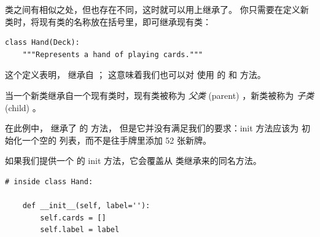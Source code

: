 
类之间有相似之处，但也存在不同，这时就可以用上继承了。
你只需要在定义新类时，将现有类的名称放在括号里，即可继承现有类：


\begin{lstlisting}
class Hand(Deck):
    """Represents a hand of playing cards."""
\end{lstlisting}


这个定义表明， 继承自  ；  这意味着我们也可以对  使用  的  和  方法。


当一个新类继承自一个现有类时，现有类被称为 {\em 父类} (parent) ，新类被称为 {\em 子类} (child) 。



在此例中，  继承了  的  方法，
但是它并没有满足我们的要求：init 方法应该为  初始化一个空的 
列表，而不是往手牌里添加 52 张新牌。



如果我们提供一个  的 init 方法，它会覆盖从  类继承来的同名方法。

\begin{lstlisting}
# inside class Hand:

    def __init__(self, label=''):
        self.cards = []
        self.label = label
\end{lstlisting}

